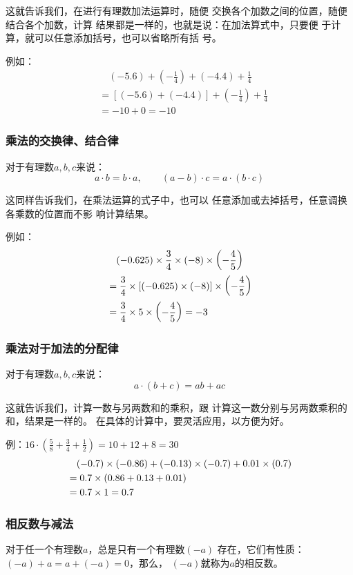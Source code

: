 这就告诉我们，在进行有理数加法运算时，随便
交换各个加数之间的位置，随便结合各个加数，计算
结果都是一样的，也就是说：在加法算式中，只要便
于计算，就可以任意添加括号，也可以省略所有括
号。

例如：
\[\begin{split}
&\quad (-5.6)+\left(-\frac{1}{4}\right)+(-4.4)+\frac{1}{4}\\
&=[(-5.6)+(-4.4)]+\left(-\frac{1}{4}\right)+\frac{1}{4}\\
&=-10+0=-10
\end{split}\]

\subsubsection{乘法的交换律、结合律}
\begin{blk}{}
	对于有理数$a, b, c$来说：
	\[ a\cdot b=b\cdot a,\qquad   (a-b)\cdot c=a\cdot  (b\cdot  c)\]
\end{blk}


这同样告诉我们，在乘法运算的式子中，也可以
任意添加或去掉括号，任意调换各乘数的位置而不影
响计算结果。

例如：\[\begin{split}
&\quad  (-0.625)\times\dfrac{3}{4}\times(-8)\times\left(-\dfrac{4}{5}\right)\\
&=\dfrac{3}{4}\times[(-0.625)\times(-8)]\times\left(-\dfrac{4}{5}\right)\\
&=\dfrac{3}{4}\times5\times\left(-\dfrac{4}{5}\right)=-3
\end{split}\]


\subsubsection{乘法对于加法的分配律}
\begin{blk}{}
	对于有理数$a,  b,  c$来说：
	\[ a\cdot (b+c)=ab+ac\]
\end{blk}

这就告诉我们，计算一数与另两数和的乘积，跟
计算这一数分别与另两数乘积的和，结果是一样的。
在具体的计算中，要灵活应用，以方便为好。

例：$16\cdot \left(\frac{5}{8}+\frac{3}{4}+\frac{1}{2}\right)=10+12+8=30$
\[\begin{split}
&\quad (-0.7)\times (-0.86)+(-0.13)\times (-0.7)+0.01\times (0.7)\\
&=0.7\times (0.86+0.13+0.01)\\
&=0.7\times 1=0.7
\end{split}\]

\subsubsection{相反数与减法}
\begin{blk}{}
	对于任一个有理数$a$，总是只有一个有理数$(-a)$
	存在，它们有性质：$(-a) +a=a+(-a)=0$，那么，
	$(-a)$就称为$a$的相反数。
\end{blk}


